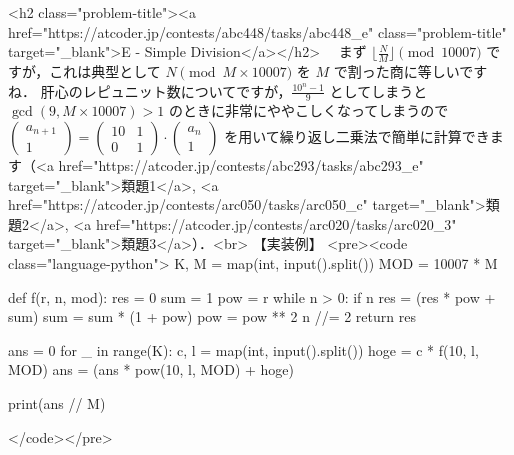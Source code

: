 <h2 class="problem-title"><a href="https://atcoder.jp/contests/abc448/tasks/abc448_e" class="problem-title" target="_blank">E - Simple Division</a></h2>
　まず $\big\lfloor \frac{N}{M} \big\rfloor \pmod {10007}$ ですが，これは典型として $N \pmod {M\times 10007}$ を $M$ で割った商に等しいですね．
肝心のレピュニット数についてですが，$\frac{10^n-1}{9}$ としてしまうと $\gcd(9, M\times 10007) > 1$ のときに非常にややこしくなってしまうので $\begin{pmatrix}
a_{n+1} \\ 1 \end{pmatrix} = \begin{pmatrix} 10 & 1 \\ 0 & 1 \end{pmatrix} \cdot \begin{pmatrix} a_n \\ 1 \end{pmatrix}$ 
を用いて繰り返し二乗法で簡単に計算できます（<a href="https://atcoder.jp/contests/abc293/tasks/abc293_e" target="_blank">類題1</a>, <a href="https://atcoder.jp/contests/arc050/tasks/arc050_c" target="_blank">類題2</a>, <a href="https://atcoder.jp/contests/arc020/tasks/arc020_3" target="_blank">類題3</a>）．<br>
【実装例】
<pre><code class="language-python">
K, M = map(int, input().split())
MOD = 10007 * M

def f(r, n, mod):
    res = 0
    sum = 1
    pow = r
    while n > 0:
        if n %
            res = (res * pow + sum) %
        sum = sum * (1 + pow) %
        pow = pow ** 2 %
        n //= 2
    return res

ans = 0
for _ in range(K):
    c, l = map(int, input().split())
    hoge = c * f(10, l, MOD) %
    ans = (ans * pow(10, l, MOD) + hoge) %

print(ans // M)

</code></pre>
